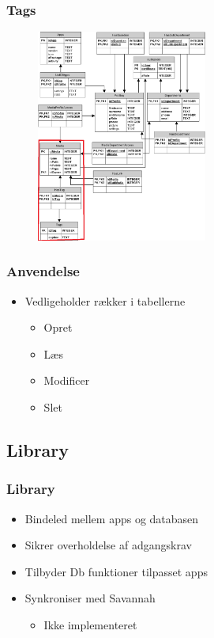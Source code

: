 \documentclass{beamer}
\begin{document}
\begin{frame}
	\frametitle{Tags}
	
	\begin{figure}[!h]
		\centering
			\includegraphics[width=0.5\textwidth]{dbTags}
		\label{fig:Tags}
	\end{figure}
\end{frame}



\begin{frame}
	\frametitle{Anvendelse}
	
	\begin{itemize}
		\item Vedligeholder r\ae{}kker i tabellerne
		\begin{itemize}
			\item Opret
			\item L\ae{}s
			\item Modificer
			\item Slet
		\end{itemize}
	\end{itemize}
\end{frame}

\subsection{Library}

\begin{frame}
	\frametitle{Library}
	\begin{itemize}
		\item Bindeled mellem apps og databasen
		\item Sikrer overholdelse af adgangskrav
		\item Tilbyder Db funktioner tilpasset apps
	\end{itemize}
	\begin{itemize}
		\item Synkroniser med Savannah
		\begin{itemize}
			\item Ikke implementeret
		\end{itemize}
	\end{itemize}
\end{frame}
\end{document}

